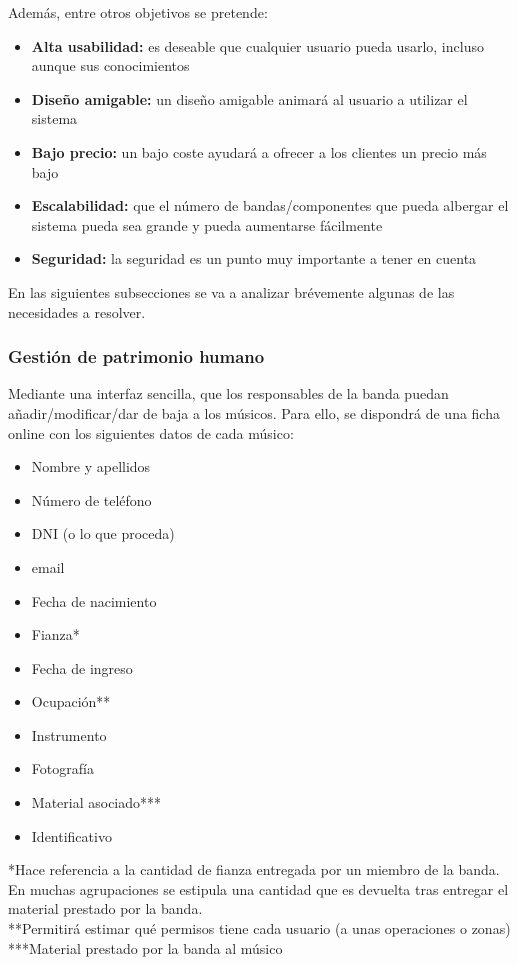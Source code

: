 \documentclass[11pt,spanish]{article}
\begin{document}
\setlength{\parskip}{10pt plus 1pt minus 1pt}

Además, entre otros objetivos se pretende:
\begin{itemize}
  \item \textbf{Alta usabilidad:} es deseable que cualquier usuario pueda usarlo,
    incluso aunque sus conocimientos
  \item \textbf{Diseño amigable:} un diseño amigable animará al usuario a utilizar el sistema
  \item \textbf{Bajo precio:} un bajo coste ayudará a ofrecer a los clientes un precio más bajo
  \item \textbf{Escalabilidad:} que el número de bandas/componentes que pueda albergar el sistema
  pueda sea grande y pueda aumentarse fácilmente
  \item \textbf{Seguridad:} la seguridad es un punto muy importante a tener en cuenta
\end{itemize}


En las siguientes subsecciones se va a analizar brévemente algunas de las necesidades a
resolver.

\subsubsection{Gestión de patrimonio humano}
Mediante una interfaz sencilla, que los responsables de la banda puedan añadir/modificar/dar
de baja a los músicos. Para ello, se dispondrá de una ficha online con los siguientes datos de cada músico:
\begin{itemize}
  \item Nombre y apellidos
  \item Número de teléfono
  \item DNI (o lo que proceda)
  \item email
  \item Fecha de nacimiento
  \item Fianza*
  \item Fecha de ingreso
  \item Ocupación**
  \item Instrumento
  \item Fotografía
  \item Material asociado***
  \item Identificativo
\end{itemize}
\footnotesize{*Hace referencia a la cantidad de fianza entregada por un miembro
de la banda. En muchas agrupaciones se estipula una cantidad que es devuelta tras entregar
el material prestado por la banda.}\\
\footnotesize{**Permitirá estimar qué permisos tiene cada usuario (a unas operaciones
o zonas)}\\
\footnotesize{***Material prestado por la banda al músico}
\end{document}

